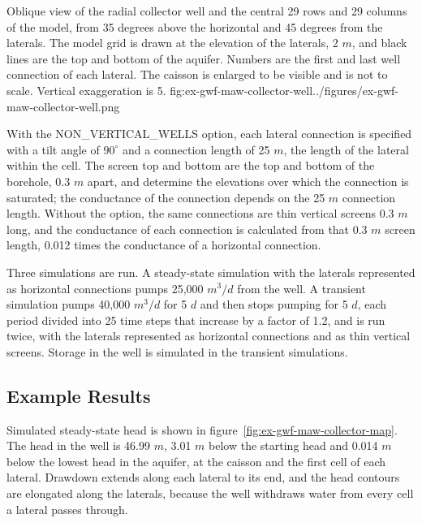 \begin{StandardFigure}{
    Oblique view of the radial collector well and the central 29 rows and 29 columns of the model, from 35 degrees above the horizontal and 45 degrees from the laterals. The model grid is drawn at the elevation of the laterals, 2 $m$, and black lines are the top and bottom of the aquifer. Numbers are the first and last well connection of each lateral. The caisson is enlarged to be visible and is not to scale. Vertical exaggeration is 5.
    }{fig:ex-gwf-maw-collector-well}{../figures/ex-gwf-maw-collector-well.png}
\end{StandardFigure}

With the NON\_VERTICAL\_WELLS option, each lateral connection is specified with a tilt angle of $90^{\circ}$ and a connection length of 25 $m$, the length of the lateral within the cell. The screen top and bottom are the top and bottom of the borehole, 0.3 $m$ apart, and determine the elevations over which the connection is saturated; the conductance of the connection depends on the 25 $m$ connection length. Without the option, the same connections are thin vertical screens 0.3 $m$ long, and the conductance of each connection is calculated from that 0.3 $m$ screen length, 0.012 times the conductance of a horizontal connection.

Three simulations are run. A steady-state simulation with the laterals represented as horizontal connections pumps 25,000 $m^3/d$ from the well. A transient simulation pumps 40,000 $m^3/d$ for 5 $d$ and then stops pumping for 5 $d$, each period divided into 25 time steps that increase by a factor of 1.2, and is run twice, with the laterals represented as horizontal connections and as thin vertical screens. Storage in the well is simulated in the transient simulations.



\subsection{Example Results}

Simulated steady-state head is shown in figure~\ref{fig:ex-gwf-maw-collector-map}. The head in the well is 46.99 $m$, 3.01 $m$ below the starting head and 0.014 $m$ below the lowest head in the aquifer, at the caisson and the first cell of each lateral. Drawdown extends along each lateral to its end, and the head contours are elongated along the laterals, because the well withdraws water from every cell a lateral passes through.


